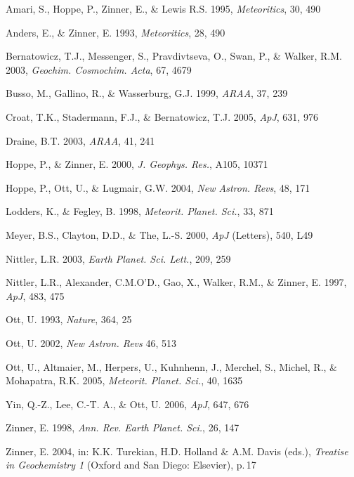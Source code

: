 \documentclass{iau}
\begin{document}
\begin{thebibliography}{}

{Amari, S., Hoppe, P., Zinner, E., \& Lewis R.S.} 1995,
\textit{Meteoritics}, 30, 490 

{Anders, E., \& Zinner, E.} 1993, 
\textit{Meteoritics}, 28, 490

{Bernatowicz, T.J., Messenger, S., Pravdivtseva, O., Swan, P., \& Walker, R.M.} 2003, 
\textit{Geochim. Cosmochim. Acta}, 67, 4679

{Busso, M., Gallino, R., \& Wasserburg, G.J.} 1999, 
\textit{ARAA}, 37, 239

{Croat, T.K., Stadermann, F.J., \& Bernatowicz, T.J.} 2005, 
\textit{ApJ}, 631, 976

{Draine, B.T.} 2003,
\textit{ARAA}, 41, 241

{Hoppe, P., \& Zinner, E.} 2000, 
\textit{J. Geophys. Res.}, A105, 10371

{Hoppe, P., Ott, U., \& Lugmair, G.W.} 2004, 
\textit{New Astron. Revs}, 48, 171

{Lodders, K., \& Fegley, B.} 1998, 
\textit{Meteorit. Planet. Sci.}, 33, 871

{Meyer, B.S., Clayton, D.D., \& The, L.-S.} 2000, 
\textit{ApJ} (Letters), 540, L49

{Nittler, L.R.} 2003, 
\textit{Earth Planet. Sci. Lett.}, 209, 259

{Nittler, L.R., Alexander, C.M.O'D., Gao, X., Walker, R.M., \& Zinner, E.} 1997,
\textit{ApJ}, 483, 475

{Ott, U.} 1993, 
\textit{Nature}, 364, 25

{Ott, U.} 2002,
\textit{New Astron. Revs} 46, 513

{Ott, U., Altmaier, M., Herpers, U., Kuhnhenn, J., Merchel, S., 
Michel, R., \& Mohapatra, R.K.} 2005, 
\textit{Meteorit. Planet. Sci.}, 40, 1635

{Yin, Q.-Z., Lee, C.-T. A., \& Ott, U.} 2006, 
 \textit{ApJ}, 647, 676

{Zinner, E.} 1998,
 \textit{Ann. Rev. Earth Planet. Sci.}, 26, 147

{Zinner, E.} 2004, in: K.K. Turekian, H.D. Holland \& A.M. Davis (eds.), 
 \textit{Treatise in Geochemistry 1} (Oxford and San Diego: Elsevier), p.\,17

\end{thebibliography}
\end{document}
